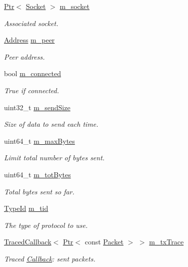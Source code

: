 \begin{DoxyCompactItemize}
\item 
\hyperlink{classns3_1_1Ptr}{Ptr}$<$ \hyperlink{classns3_1_1Socket}{Socket} $>$ \hyperlink{classns3_1_1BulkSendApplication_ac77d828305505de6cd36753e32bec4c0}{m\+\_\+socket}
\begin{DoxyCompactList}\small\item\em Associated socket. \end{DoxyCompactList}\item 
\hyperlink{classns3_1_1Address}{Address} \hyperlink{classns3_1_1BulkSendApplication_a0f4c02d4849b50e26ba6f5cbc90d56c4}{m\+\_\+peer}
\begin{DoxyCompactList}\small\item\em Peer address. \end{DoxyCompactList}\item 
bool \hyperlink{classns3_1_1BulkSendApplication_a85426b1c45ff85e687c101ff2c40a598}{m\+\_\+connected}
\begin{DoxyCompactList}\small\item\em True if connected. \end{DoxyCompactList}\item 
uint32\+\_\+t \hyperlink{classns3_1_1BulkSendApplication_a9546f4e64ebd4043c2054a6830430f12}{m\+\_\+send\+Size}
\begin{DoxyCompactList}\small\item\em Size of data to send each time. \end{DoxyCompactList}\item 
uint64\+\_\+t \hyperlink{classns3_1_1BulkSendApplication_aaada1266be784683ddfa76dc71efbc06}{m\+\_\+max\+Bytes}
\begin{DoxyCompactList}\small\item\em Limit total number of bytes sent. \end{DoxyCompactList}\item 
uint64\+\_\+t \hyperlink{classns3_1_1BulkSendApplication_ac59c8703121edfc01fcbf812088d0944}{m\+\_\+tot\+Bytes}
\begin{DoxyCompactList}\small\item\em Total bytes sent so far. \end{DoxyCompactList}\item 
\hyperlink{classns3_1_1TypeId}{Type\+Id} \hyperlink{classns3_1_1BulkSendApplication_aae69cccb430dce06f51f507bccbb8396}{m\+\_\+tid}
\begin{DoxyCompactList}\small\item\em The type of protocol to use. \end{DoxyCompactList}\item 
\hyperlink{classns3_1_1TracedCallback}{Traced\+Callback}$<$ \hyperlink{classns3_1_1Ptr}{Ptr}$<$ const \hyperlink{classns3_1_1Packet}{Packet} $>$ $>$ \hyperlink{classns3_1_1BulkSendApplication_a982bb90de3aab9858bc23c1fd3e5987e}{m\+\_\+tx\+Trace}
\begin{DoxyCompactList}\small\item\em Traced \hyperlink{classns3_1_1Callback}{Callback}\+: sent packets. \end{DoxyCompactList}\end{DoxyCompactItemize}
